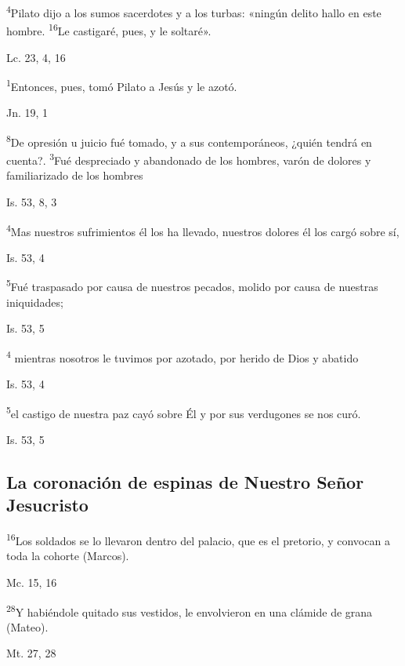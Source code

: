 \documentclass[a4paper,11pt]{article}
\begin{document}
      \textsuperscript{4}Pilato dijo a los sumos sacerdotes y a los turbas: «ningún delito hallo en este hombre. \textsuperscript{16}Le castigaré, pues, y le soltaré».
      \begin{flushright}
        Lc. 23, 4, 16
      \end{flushright}

      \textsuperscript{1}Entonces, pues, tomó Pilato a Jesús y le azotó.
      \begin{flushright}
        Jn. 19, 1
      \end{flushright}

      \textsuperscript{8}De opresión u juicio fué tomado, y a sus contemporáneos, ¿quién tendrá en cuenta?. \textsuperscript{3}Fué despreciado y abandonado de los hombres,
      varón de dolores y familiarizado de los hombres
      \begin{flushright}
        Is. 53, 8, 3
      \end{flushright}

      \textsuperscript{4}Mas nuestros sufrimientos él los ha llevado, nuestros dolores él los cargó sobre sí,
      \begin{flushright}
        Is. 53, 4
      \end{flushright}

      \textsuperscript{5}Fué traspasado por causa de nuestros pecados, molido por causa de nuestras iniquidades; 
      \begin{flushright}
        Is. 53, 5
      \end{flushright}

      \textsuperscript{4} mientras nosotros le tuvimos por azotado, por herido de Dios y abatido
      \begin{flushright}
        Is. 53, 4 
      \end{flushright}

      \textsuperscript{5}el castigo de nuestra paz cayó sobre Él y por sus verdugones se nos curó.
      \begin{flushright}
        Is. 53, 5
      \end{flushright}
      
    \subsection*{\hfil La coronación de espinas de Nuestro Señor Jesucristo \hfil}
      
      \textsuperscript{16}Los soldados se lo llevaron dentro del palacio, que es el pretorio, y convocan a toda la cohorte (Marcos).
      \begin{flushright}
        Mc. 15, 16
      \end{flushright}
      \textsuperscript{28}Y habiéndole quitado sus vestidos, le envolvieron en una clámide de grana (Mateo).
      \begin{flushright}
        Mt. 27, 28
      \end{flushright}
\end{document}
